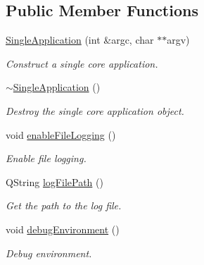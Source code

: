 \subsection*{Public Member Functions}
\begin{DoxyCompactItemize}
\item 
\hyperlink{class_mdt_1_1_single_application_a481cd7bad65a75dd891ca33cb80c82c5}{Single\+Application} (int \&argc, char $\ast$$\ast$argv)
\begin{DoxyCompactList}\small\item\em Construct a single core application. \end{DoxyCompactList}\item 
\hyperlink{class_mdt_1_1_single_application_a49ff3421ee835333c6ebc00e8cdbf7ba}{$\sim$\+Single\+Application} ()
\begin{DoxyCompactList}\small\item\em Destroy the single core application object. \end{DoxyCompactList}\item 
void \hyperlink{class_mdt_1_1_single_application_abfd6a19af0b13b2785f2db7dd8db82a0}{enable\+File\+Logging} ()
\begin{DoxyCompactList}\small\item\em Enable file logging. \end{DoxyCompactList}\item 
Q\+String \hyperlink{class_mdt_1_1_single_application_a77ad0fd06b6b46107dc2f6c170325987}{log\+File\+Path} ()
\begin{DoxyCompactList}\small\item\em Get the path to the log file. \end{DoxyCompactList}\item 
void \hyperlink{class_mdt_1_1_single_application_a884f933e6b26b1a36b564e2b5e8f8536}{debug\+Environment} ()
\begin{DoxyCompactList}\small\item\em Debug environment. \end{DoxyCompactList}\end{DoxyCompactItemize}
